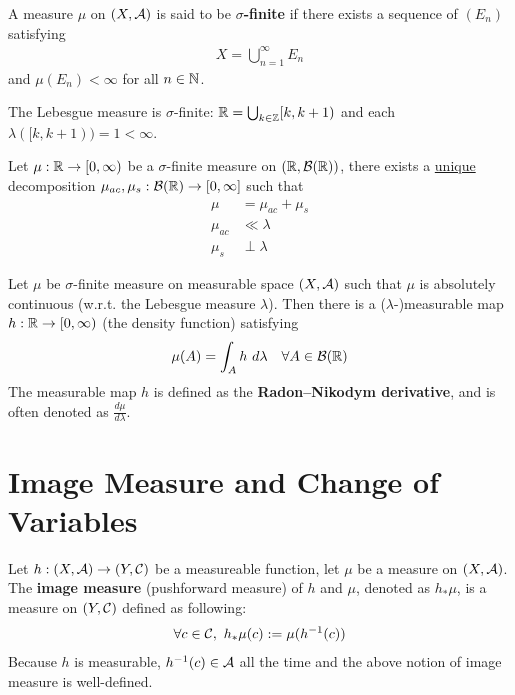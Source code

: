 \documentclass[11pt]{article}
\numberwithin{equation}{section}
\newcommand{\s}[0]{$\sigma$}
\begin{document}
	\begin{definition}
	    A measure $\mu$ on $(X, \mathcal{{A}})$ is said to be \textbf{\s-finite} if there exists a sequence of $(E_n)$ satisfying
	    \begin{align}
	        X = \bigcup_{n=1}^\infty E_n
	    \end{align}
	    and $\mu(E_n) < \infty$ for all $n \in \mathbb{N}$.
	\end{definition}
	
	\begin{example}
	    The Lebesgue measure is \s-finite: $\mathbb{R} = \bigcup_{k \in \mathbb{Z}} [k, k+1)$ and each $\lambda([k, k+1)) = 1 < \infty$.
	\end{example}

    \begin{theorem}
        Let $\mu: \mathbb{R} \to [0, \infty)$ be a \s-finite measure on $(\mathbb{R}, \mathcal{{B}}(\mathbb{R}))$, there exists a \ul{unique} decomposition $\mu_{ac}, \mu_s: \mathcal{{B}}(\mathbb{R}) \to [0, \infty]$ such that
        \begin{align}
            \mu &= \mu_{ac} + \mu_s \\
            \mu_{ac} &\ll \lambda \\
            \mu_s &\perp \lambda
        \end{align}
    \end{theorem}
    
    \begin{theorem}
        Let $\mu$ be \s-finite measure on measurable space $(X, \mathcal{{A}})$ such that $\mu$ is absolutely continuous (w.r.t. the Lebesgue measure $\lambda$).
        Then there is a ($\lambda$-)measurable map $h: \mathbb{R} \to [0, \infty)$ (the density function) satisfying
        \begin{align}
            \mu (A) = \int_A h\ d\lambda\quad \forall A \in \mathcal{{B}}(\mathbb{R})
        \end{align}
        The measurable map $h$ is defined as the \textbf{Radon–Nikodym derivative}, and is often denoted as $\frac{d \mu}{d \lambda}$.
    \end{theorem}
    
    \section{Image Measure and Change of Variables}
    \begin{definition}
        Let $h: (X, \mathcal{{A}}) \to (Y, \mathcal{{C}})$ be a measureable function, let $\mu$ be a measure on $(X, \mathcal{{A}})$. The \textbf{image measure} (pushforward measure) of $h$ and $\mu$, denoted as $h_*\mu$, is a measure on $(Y, \mathcal{{C}})$ defined as following:
        \begin{align}
            \forall c \in \mathcal{{C}},\ h_*\mu(c) := \mu(h^{-1}(c)) 
        \end{align}
        Because $h$ is measurable, $h^{-1}(c) \in \mathcal{{A}}$ all the time and the above notion of image measure is well-defined.
    \end{definition}
\end{document}
